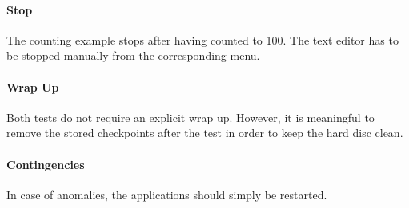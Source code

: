 \paragraph{Stop}
The counting example stops after having counted to 100. The text editor has to be stopped manually from the corresponding menu.

\paragraph{Wrap Up}
Both tests do not require an explicit wrap up. However, it is meaningful to remove the stored checkpoints after the test in order to keep the hard disc clean.

\paragraph{Contingencies}
In case of anomalies, the applications should simply be restarted.
